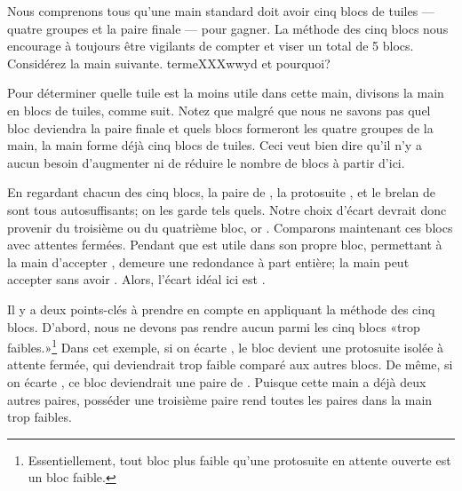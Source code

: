 Nous comprenons tous qu'une main standard
doit avoir cinq blocs de tuiles --- quatre groupes et la paire finale --- pour gagner. 
La méthode des cinq blocs nous encourage à toujours être vigilants de compter et viser un total de 5 blocs.
Considérez la main suivante. termeXXXwwyd et pourquoi?

\bp
{}\zhong\zhong\zhong
\ep

Pour déterminer quelle tuile est la moins utile dans cette main, divisons la main en blocs de tuiles, comme suit. 
\emj
Notez que malgré que nous ne savons pas quel bloc deviendra la paire finale et quels blocs formeront les quatre groupes de la main, la main forme déjà cinq blocs de tuiles. Ceci veut bien dire qu'il n'y a aucun besoin d'augmenter ni de réduire le nombre de blocs à partir d'ici. 

\bigskip
En regardant chacun des cinq blocs, la paire de {\LARGE{}}, la protosuite {\LARGE{}}, et le brelan de {\LARGE\zhong} sont tous autosuffisants; on les garde tels quels. Notre choix d'écart devrait donc provenir du troisième ou du quatrième bloc, {\LARGE{}} or {\LARGE{}}. 
Comparons maintenant ces blocs avec attentes fermées. Pendant que {\LARGE{}} est utile dans son propre bloc, permettant à la main d'accepter {\LARGE{}}, {\LARGE{}} demeure une redondance à part entière; la main peut accepter {\LARGE{}} sans avoir {\LARGE{}}. Alors, l'écart idéal ici est {\LARGE{}}. 

\bigskip
Il y a deux points-clés à prendre en compte en appliquant la méthode des cinq blocs. 
D'abord, nous ne devons pas rendre aucun parmi les cinq blocs «trop faibles.»\footnote{Essentiellement, tout bloc plus faible qu'une protosuite en attente ouverte est un bloc faible.} Dans cet exemple, si on écarte {\LARGE{}}, le bloc {\LARGE{}} devient une protosuite isolée à attente fermée, qui deviendrait trop faible comparé aux autres blocs. De même, si on écarte {\LARGE{}}, ce bloc deviendrait une paire de {\LARGE{}}. Puisque cette main a déjà deux autres paires, posséder une troisième paire rend toutes les paires dans la main trop faibles. 

